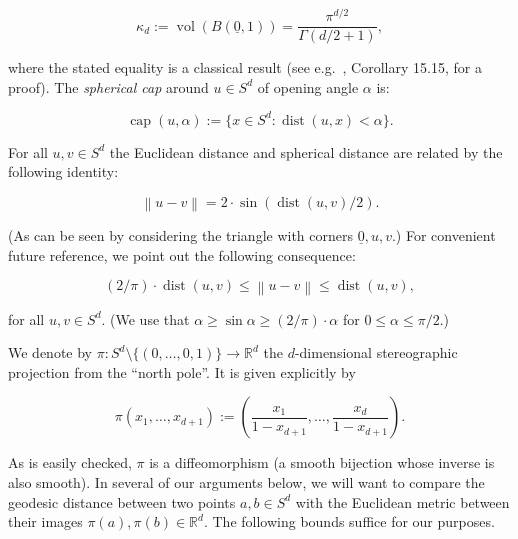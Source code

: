 \documentclass[11pt]{article}%
\newcommand{\eR}[0]{\ensuremath{ \mathbb R}}
\newcommand{\norm}[1]{\ensuremath{\left\|#1\right\|}}
\newcommand{\orig}{\underline{0}}
\DeclareMathOperator{\dist}{dist}
\DeclareMathOperator{\vol}{vol}
\DeclareMathOperator{\kap}{cap}
\begin{document}
\begin{equation}\label{eq:volball} 
\kappa_d := \vol( B(\orig,1) ) = \frac{\pi^{d/2}}{\Gamma(d/2+1)},  
\end{equation}

\noindent
where the stated equality is a classical result (see e.g.~\cite{Schilling}, Corollary 15.15, for a proof).
The {\em spherical cap} around $u \in S^d$ of opening angle $\alpha$ is:

$$ \kap(u,\alpha) := \{ x \in S^d : \dist(u,x) < \alpha \}. $$

For all $u, v \in S^d$ the Euclidean distance and spherical distance are related by the 
following identity:

$$ \norm{u-v} = 
2 \cdot \sin\left(\dist(u,v)/2\right). $$

\noindent
(As can be seen by considering the triangle with 
corners $\orig, u, v$.)
For convenient future reference, we point out the following consequence:

\begin{equation}\label{eq:distnorm} 
(2/\pi) \cdot \dist(u,v) \leq \norm{u-v} \leq \dist(u,v),  
\end{equation}

\noindent
for all $u,v \in S^d$. 
(We use that $\alpha \geq \sin\alpha \geq (2/\pi)\cdot\alpha$ for $0 \leq \alpha \leq \pi/2$.)


\vspace{.5ex}

We denote by $\pi : S^d \setminus \{(0,\dots,0,1)\} \to \eR^d$ the $d$-dimensional stereographic projection from the 
``north pole''. 
It is given explicitly by 

$$ \pi(x_1,\dots,x_{d+1}) := \left(\frac{x_1}{1-x_{d+1}},\dots,\frac{x_d}{1-x_{d+1}}\right). $$

\noindent 
As is easily checked, $\pi$ is a diffeomorphism (a smooth bijection whose inverse is also smooth).
In several of our arguments below, we will want to compare the geodesic distance between two points $a, b \in S^d$ with the 
Euclidean metric between their images $\pi(a),\pi(b) \in \eR^d$.
The following bounds suffice for our purposes.
\end{document}
